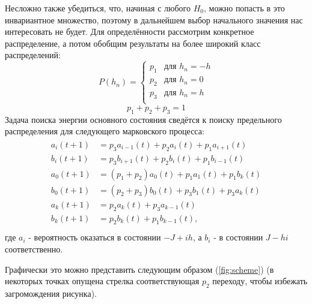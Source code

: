 	Несложно также убедиться, что, начиная с любого $H_0$, можно попасть в это инвариантное множество, поэтому в дальнейшем выбор начального значения нас интересовать не будет.
	Для определённости рассмотрим конкретное распределение, а потом обобщим результаты на более широкий класс распределений:
\begin{equation}
P(h_n) =
\begin{cases}
p_1 &\mbox{для } h_n= -h \\
p_2 &\mbox{для } h_n= 0 \\
p_3 &\mbox{для } h_n= h\\
\end{cases}
\end{equation}
\begin{equation}
p_1+p_2+p_3 = 1
\end{equation}
Задача поиска энергии основного состояния сведётся к поиску предельного распределения для следующего марковского процесса:
\begin{align}
\label{eq:matrix}
\begin{split}
a_i(t+1) &= p_3 a_{i-1}(t) + p_2 a_i(t) + p_1 a_{i+1}(t)\\
b_i(t+1)&= p_3 b_{i+1}(t) + p_2 b_i(t) + p_1 b_{i-1}(t)\\
a_0(t+1)&= (p_1 + p_2) a_0(t) + p_1 a_1(t) + p_1 b_k(t)\\
b_0(t+1) &= (p_2 + p_3) b_0(t) + p_3 b_1(t) + p_3 a_k(t) \\
a_k(t+1) &= p_2 a_k(t) + p_3 a_{k-1}(t)\\
b_k(t+1) &= p_2 b_k(t) + p_1 b_{k-1}(t),\\
\end{split}
\end{align}
где $a_i$ - вероятность оказаться в состоянии $-J+ih$, а $b_i$ - в состоянии $J-hi$ соответственно.

Графически это можно представить следующим образом (\ref{fig:scheme}) (в некоторых точках опущена стрелка соответствующая $p_2$ переходу, чтобы избежать загромождения рисунка).

